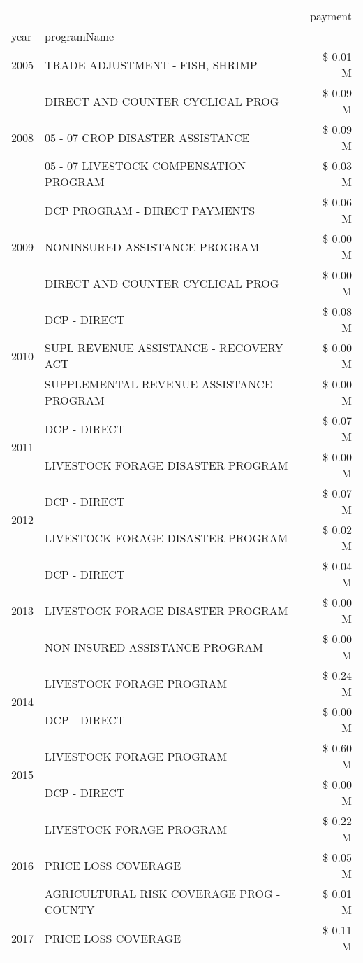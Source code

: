 \begin{tabular}{llr}
\toprule
 &  & payment \\
year & programName &  \\
\midrule
2005 & TRADE ADJUSTMENT - FISH, SHRIMP & \$ 0.01 M \\
\cline{1-3}
\multirow[t]{3}{*}{2008} & DIRECT AND COUNTER CYCLICAL PROG & \$ 0.09 M \\
 & 05 - 07 CROP DISASTER ASSISTANCE & \$ 0.09 M \\
 & 05 - 07 LIVESTOCK COMPENSATION PROGRAM & \$ 0.03 M \\
\cline{1-3}
\multirow[t]{3}{*}{2009} & DCP PROGRAM - DIRECT PAYMENTS & \$ 0.06 M \\
 & NONINSURED ASSISTANCE PROGRAM & \$ 0.00 M \\
 & DIRECT AND COUNTER CYCLICAL PROG & \$ 0.00 M \\
\cline{1-3}
\multirow[t]{3}{*}{2010} & DCP - DIRECT & \$ 0.08 M \\
 & SUPL REVENUE ASSISTANCE - RECOVERY ACT & \$ 0.00 M \\
 & SUPPLEMENTAL REVENUE ASSISTANCE PROGRAM & \$ 0.00 M \\
\cline{1-3}
\multirow[t]{2}{*}{2011} & DCP - DIRECT & \$ 0.07 M \\
 & LIVESTOCK FORAGE DISASTER PROGRAM & \$ 0.00 M \\
\cline{1-3}
\multirow[t]{2}{*}{2012} & DCP - DIRECT & \$ 0.07 M \\
 & LIVESTOCK FORAGE DISASTER PROGRAM & \$ 0.02 M \\
\cline{1-3}
\multirow[t]{3}{*}{2013} & DCP - DIRECT & \$ 0.04 M \\
 & LIVESTOCK FORAGE DISASTER PROGRAM & \$ 0.00 M \\
 & NON-INSURED ASSISTANCE PROGRAM & \$ 0.00 M \\
\cline{1-3}
\multirow[t]{2}{*}{2014} & LIVESTOCK FORAGE PROGRAM & \$ 0.24 M \\
 & DCP - DIRECT & \$ 0.00 M \\
\cline{1-3}
\multirow[t]{2}{*}{2015} & LIVESTOCK FORAGE PROGRAM & \$ 0.60 M \\
 & DCP - DIRECT & \$ 0.00 M \\
\cline{1-3}
\multirow[t]{3}{*}{2016} & LIVESTOCK FORAGE PROGRAM & \$ 0.22 M \\
 & PRICE LOSS COVERAGE & \$ 0.05 M \\
 & AGRICULTURAL RISK COVERAGE PROG - COUNTY & \$ 0.01 M \\
\cline{1-3}
\multirow[t]{2}{*}{2017} & PRICE LOSS COVERAGE & \$ 0.11 M \\

\end{tabular}
